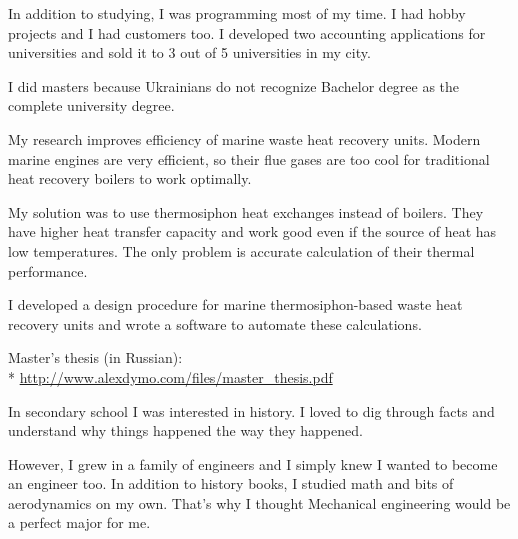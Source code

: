 \documentclass[12pt]{letter}
\begin{document}
\begin{llist}
            \item In addition to studying, I was programming most of my time. I had hobby projects and I had customers too. I developed two accounting applications for universities and sold it to 3 out of 5 universities in my city.

  \endexperience


  \startexperience

            \item I did masters because Ukrainians do not recognize Bachelor degree as the complete university degree.

            \item My research improves efficiency of marine waste heat recovery units. Modern marine engines are very efficient, so their flue gases are too cool for traditional heat recovery boilers to work optimally.

            \item My solution was to use thermosiphon heat exchanges instead of boilers. They have higher heat transfer capacity and work good even if the source of heat has low temperatures. The only problem is accurate calculation of their thermal performance.

            \item I developed a design procedure for marine thermosiphon-based waste heat recovery units and wrote a software to automate these calculations.

            \item Master's thesis (in Russian):\\*
            \url{http://www.alexdymo.com/files/master_thesis.pdf}

  \endexperience


  \startexperience

            \item In secondary school I was interested in history. I loved to dig through facts and understand why things happened the way they happened.

            \item However, I grew in a family of engineers and I simply knew I wanted to become an engineer too. In addition to history books, I studied math and bits of aerodynamics on my own. That's why I thought Mechanical engineering would be a perfect major for me.


\end{llist}
\end{document}
